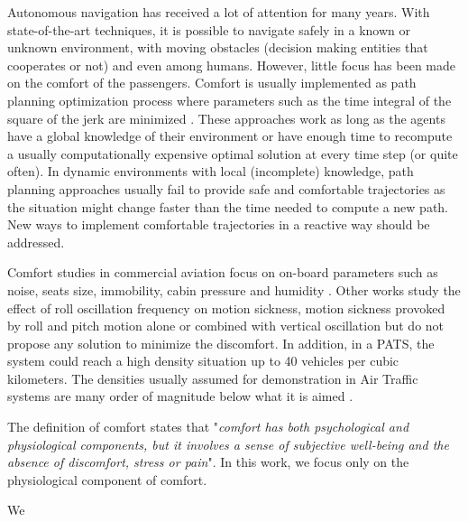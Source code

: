 Autonomous navigation has received a lot of attention for many years. With state-of-the-art techniques, it is possible to navigate safely in a known or unknown environment\cite{scherer_flying_2008}, with moving obstacles (decision making entities that cooperates or not\cite{nordlund_probabilistic_2011}) and even among humans\cite{guzzi_human-friendly_2013}. However, little focus has been made on the comfort of the passengers. Comfort is usually implemented as path planning optimization process where parameters such as the time integral of the square of the jerk are minimized \cite{gulati_framework_2009} \cite{morales_human-comfortable_2013}. These approaches work as long as the agents have a global knowledge of their environment or have enough time to recompute a usually computationally expensive optimal solution at every time step (or quite often). In dynamic environments with local (incomplete) knowledge, path planning approaches usually fail to provide safe and comfortable trajectories as the situation might change faster than the time needed to compute a new path. New ways to implement comfortable trajectories in a reactive way should be addressed. 

Comfort studies in commercial aviation focus on on-board parameters such as noise, seats size, immobility, cabin pressure and humidity \cite{hinninghofen_passenger_2006}. Other works study the effect of roll oscillation frequency on motion sickness\cite{howarth_effect_2003}, motion sickness provoked by roll and pitch motion alone or combined with vertical oscillation\cite{mccauley_motion_1976} \cite{turner_airsickness_2000} but do not propose any solution to minimize the discomfort. In addition, in a PATS, the system could reach a high density situation up to 40 vehicles per cubic kilometers\cite{truman_out_2007}. The densities usually assumed for demonstration in Air Traffic systems are many order of magnitude below what it is aimed\cite{krozel_system_2001} \cite{dowek_provably_2005}. 


The definition of comfort states that "\textit{comfort has both psychological and physiological components, but it involves a sense of subjective well-being and the absence of discomfort, stress or pain}"\cite{richards_psychology_1980}. In this work, we focus only on the physiological component of comfort. 

We 
